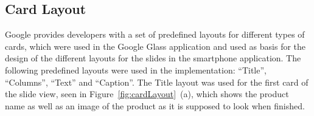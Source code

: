 






\subsection{Card Layout}
Google provides developers with a set of predefined layouts for different types of cards, which were used in the Google Glass application and used as basis for the design of the different layouts for the slides in the smartphone application. The following predefined layouts were used in the implementation: ``Title'', ``Columns'', ``Text'' and ``Caption''. The Title layout was used for the first card of the slide view, seen in Figure~\ref{fig:cardLayout}~(a), which shows the product name as well as an image of the product as it is supposed to look when finished.


